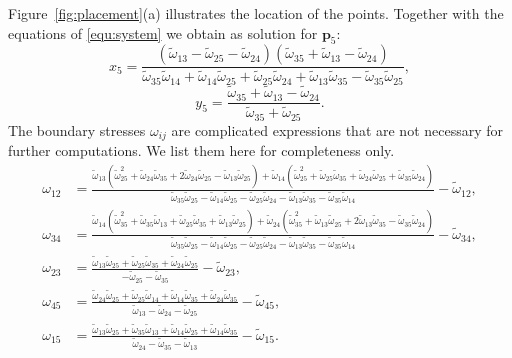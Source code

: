 \documentclass{article}
\theoremstyle{plain} \newtheorem{thm}{Theorem}[section]
\newcommand{\ot}{\tilde{\omega}}
\begin{document}
Figure~\ref{fig:placement}(a) illustrates the location of the points.
Together with the equations of 
\eqref{equ:system} we obtain as solution for $\mathbf{p}_5$:
\[x_5=
 \frac{(\ot_{13}-\ot_{25}-\ot_{24})(\ot_{35}+\ot_{13}-\ot_{24})}       {\ot_{35}\ot_{14}+\ot_{14}\ot_{25}+\ot_{25}\ot_{24}+\ot_{13}\ot_{35}-\ot_{35}\ot_{25}},\]
 \[y_5=\frac{\ot_{35}+\ot_{13}-\ot_{24}}{\ot_{35}+\ot_{25}} .\]
The boundary stresses $\omega_{ij}$ are complicated expressions
that are not necessary for further computations.
We list them here for completeness only.
\begin{align*}
\omega_{12}  &= 
 \frac{\ot_{13}(\ot_{25}^2+\ot_{24}\ot_{35}+2\ot_{24}\ot_{25}-\ot_{13}\ot_{25})
       \!+\!\ot_{14}(\ot_{25}^2+\ot_{25}\ot_{35}+\ot_{24}\ot_{25}+\ot_{35}\ot_{24})}
       {\ot_{35}\ot_{25}-\ot_{14}\ot_{25}-\ot_{25}\ot_{24}-\ot_{13}\ot_{35}-\ot_{35}\ot_{14}}- \ot_{12},\\         
\omega_{34} &=  
 \frac{ \ot_{14}(\ot_{35}^2+\ot_{35}\ot_{13}+\ot_{25}\ot_{35}+\ot_{13}\ot_{25})
       \!+\!\ot_{24}(\ot_{35}^2+\ot_{13}\ot_{25}+2\ot_{13}\ot_{35}-\ot_{35}\ot_{24})}
       {\ot_{35}\ot_{25}-\ot_{14}\ot_{25}-\ot_{25}\ot_{24}-\ot_{13}\ot_{35}-\ot_{35}\ot_{14}} - \ot_{34},  \\
\omega_{23} & = 
\frac{\ot_{13}\ot_{25}+\ot_{25}\ot_{35}+\ot_{24}\ot_{25}}
         {-\ot_{25}-\ot_{35}}     -\ot_{23}, \\
\omega_{45}  & = 
\frac{\ot_{24}\ot_{25}+\ot_{25}\ot_{14}+\ot_{14}\ot_{35}+\ot_{24}\ot_{35}}
         {\ot_{13}-\ot_{24}-\ot_{25}}     -\ot_{45}, 
\\[1.1ex]
\omega_{15} & = 
\frac{\ot_{13}\ot_{25}+\ot_{35}\ot_{13}+\ot_{14}\ot_{25}+\ot_{14}\ot_{35}}
         {\ot_{24}-\ot_{35}-\ot_{13}}     -\ot_{15}. 
\end{align*}
\end{document}
